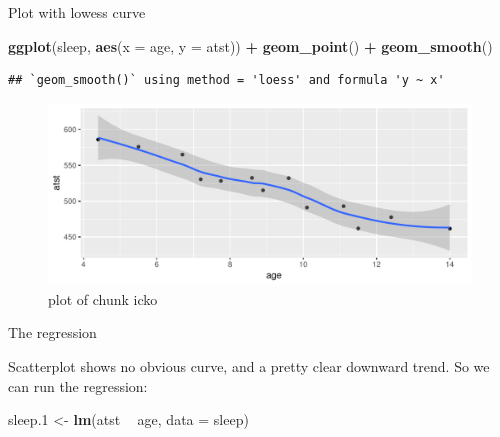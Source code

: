 \documentclass[ignorenonframetext,]{beamer}
\newenvironment{Shaded}{\begin{snugshade}}{\end{snugshade}}
\newcommand{\DataTypeTok}[1]{\textcolor[rgb]{0.13,0.29,0.53}{#1}}
\newcommand{\FloatTok}[1]{\textcolor[rgb]{0.00,0.00,0.81}{#1}}
\newcommand{\KeywordTok}[1]{\textcolor[rgb]{0.13,0.29,0.53}{\textbf{#1}}}
\newcommand{\NormalTok}[1]{#1}
\newcommand{\OperatorTok}[1]{\textcolor[rgb]{0.81,0.36,0.00}{\textbf{#1}}}
\newcommand{\StringTok}[1]{\textcolor[rgb]{0.31,0.60,0.02}{#1}}
\begin{document}
\begin{frame}[fragile]{Plot with lowess curve}
\protect\hypertarget{plot-with-lowess-curve}{}

\begin{Shaded}
\begin{Highlighting}[]
\KeywordTok{ggplot}\NormalTok{(sleep, }\KeywordTok{aes}\NormalTok{(}\DataTypeTok{x =}\NormalTok{ age, }\DataTypeTok{y =}\NormalTok{ atst)) }\OperatorTok{+}\StringTok{ }\KeywordTok{geom_point}\NormalTok{() }\OperatorTok{+}
\StringTok{  }\KeywordTok{geom_smooth}\NormalTok{()}
\end{Highlighting}
\end{Shaded}

\begin{verbatim}
## `geom_smooth()` using method = 'loess' and formula 'y ~ x'
\end{verbatim}

\begin{figure}
\centering
\includegraphics{figure/icko-1.pdf}
\caption{plot of chunk icko}
\end{figure}

\end{frame}

\begin{frame}[fragile]{The regression}
\protect\hypertarget{the-regression}{}

Scatterplot shows no obvious curve, and a pretty clear downward trend.
So we can run the regression:

\begin{Shaded}
\begin{Highlighting}[]
\NormalTok{sleep}\FloatTok{.1}\NormalTok{ <-}\StringTok{ }\KeywordTok{lm}\NormalTok{(atst }\OperatorTok{~}\StringTok{ }\NormalTok{age, }\DataTypeTok{data =}\NormalTok{ sleep)}
\end{Highlighting}
\end{Shaded}

\end{frame}
\end{document}
